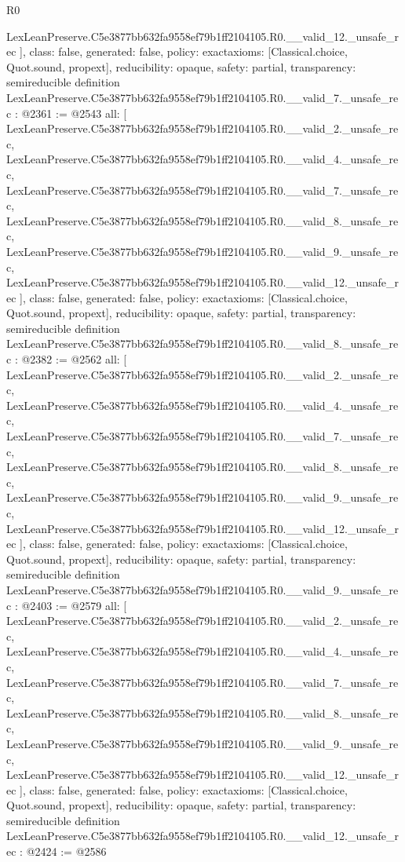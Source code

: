 \begin{lexlean}{R0}
\begin{coremodule}
{    LexLeanPreserve.C5e3877bb632fa9558ef79b1ff2104105.R0.__valid_12._unsafe_rec
  ],
  class: false,
  generated: false,
  policy: exact{axioms: [Classical.choice, Quot.sound, propext]},
  reducibility: opaque{},
  safety: partial,
  transparency: semireducible
}
definition LexLeanPreserve.C5e3877bb632fa9558ef79b1ff2104105.R0.__valid_7._unsafe_rec : @2361 := @2543 {
  all: [
    LexLeanPreserve.C5e3877bb632fa9558ef79b1ff2104105.R0.__valid_2._unsafe_rec,
    LexLeanPreserve.C5e3877bb632fa9558ef79b1ff2104105.R0.__valid_4._unsafe_rec,
    LexLeanPreserve.C5e3877bb632fa9558ef79b1ff2104105.R0.__valid_7._unsafe_rec,
    LexLeanPreserve.C5e3877bb632fa9558ef79b1ff2104105.R0.__valid_8._unsafe_rec,
    LexLeanPreserve.C5e3877bb632fa9558ef79b1ff2104105.R0.__valid_9._unsafe_rec,
    LexLeanPreserve.C5e3877bb632fa9558ef79b1ff2104105.R0.__valid_12._unsafe_rec
  ],
  class: false,
  generated: false,
  policy: exact{axioms: [Classical.choice, Quot.sound, propext]},
  reducibility: opaque{},
  safety: partial,
  transparency: semireducible
}
definition LexLeanPreserve.C5e3877bb632fa9558ef79b1ff2104105.R0.__valid_8._unsafe_rec : @2382 := @2562 {
  all: [
    LexLeanPreserve.C5e3877bb632fa9558ef79b1ff2104105.R0.__valid_2._unsafe_rec,
    LexLeanPreserve.C5e3877bb632fa9558ef79b1ff2104105.R0.__valid_4._unsafe_rec,
    LexLeanPreserve.C5e3877bb632fa9558ef79b1ff2104105.R0.__valid_7._unsafe_rec,
    LexLeanPreserve.C5e3877bb632fa9558ef79b1ff2104105.R0.__valid_8._unsafe_rec,
    LexLeanPreserve.C5e3877bb632fa9558ef79b1ff2104105.R0.__valid_9._unsafe_rec,
    LexLeanPreserve.C5e3877bb632fa9558ef79b1ff2104105.R0.__valid_12._unsafe_rec
  ],
  class: false,
  generated: false,
  policy: exact{axioms: [Classical.choice, Quot.sound, propext]},
  reducibility: opaque{},
  safety: partial,
  transparency: semireducible
}
definition LexLeanPreserve.C5e3877bb632fa9558ef79b1ff2104105.R0.__valid_9._unsafe_rec : @2403 := @2579 {
  all: [
    LexLeanPreserve.C5e3877bb632fa9558ef79b1ff2104105.R0.__valid_2._unsafe_rec,
    LexLeanPreserve.C5e3877bb632fa9558ef79b1ff2104105.R0.__valid_4._unsafe_rec,
    LexLeanPreserve.C5e3877bb632fa9558ef79b1ff2104105.R0.__valid_7._unsafe_rec,
    LexLeanPreserve.C5e3877bb632fa9558ef79b1ff2104105.R0.__valid_8._unsafe_rec,
    LexLeanPreserve.C5e3877bb632fa9558ef79b1ff2104105.R0.__valid_9._unsafe_rec,
    LexLeanPreserve.C5e3877bb632fa9558ef79b1ff2104105.R0.__valid_12._unsafe_rec
  ],
  class: false,
  generated: false,
  policy: exact{axioms: [Classical.choice, Quot.sound, propext]},
  reducibility: opaque{},
  safety: partial,
  transparency: semireducible
}
definition LexLeanPreserve.C5e3877bb632fa9558ef79b1ff2104105.R0.__valid_12._unsafe_rec : @2424 := @2586 {
}
\end{coremodule}
\end{lexlean}
